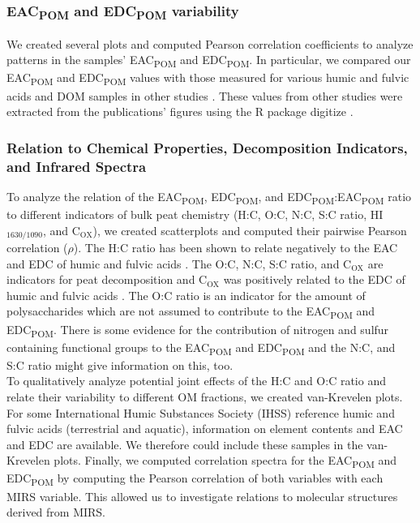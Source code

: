 \documentclass[draft,linenumbers]{agujournal2018}
\begin{document}
\subsubsection{\texorpdfstring{EAC\textsubscript{POM} and
EDC\textsubscript{POM} variability}{EAC and EDC variability}}

We created several plots and computed Pearson correlation coefficients
to analyze patterns in the samples' EAC\textsubscript{POM} and
EDC\textsubscript{POM}. In particular, we compared our
EAC\textsubscript{POM} and EDC\textsubscript{POM} values with those
measured for various humic and fulvic acids and DOM samples in other
studies \citep{Aeschbacher.2012, Tan.2017, Walpen.2018}. These values
from other studies were extracted from the publications' figures using
the R package digitize \citep{Poisot.2011}.

\subsubsection{Relation to Chemical Properties, Decomposition
Indicators, and Infrared Spectra}

To analyze the relation of the EAC\textsubscript{POM},
EDC\textsubscript{POM}, and
EDC\textsubscript{POM}:EAC\textsubscript{POM} ratio to different
indicators of bulk peat chemistry (H:C, O:C, N:C, S:C ratio,
HI\(_\text{1630/1090}\), and C\(_\text{OX}\)), we created scatterplots
and computed their pairwise Pearson correlation (\(\rho\)). The H:C
ratio has been shown to relate negatively to the EAC and EDC of humic
and fulvic acids \citep{Aeschbacher.2010, Tan.2017, Lv.2018}. The O:C,
N:C, S:C ratio, and C\(_\text{OX}\) are indicators for peat
decomposition \citep{Masiello.2008, Biester.2014, Leifeld.2012} and
C\(_\text{OX}\) was positively related to the EDC of humic and fulvic
acids \citep{Lv.2018}. The O:C ratio is an indicator for the amount of
polysaccharides \citep{Kim.2003} which are not assumed to contribute to
the EAC\textsubscript{POM} and EDC\textsubscript{POM}. There is some
evidence for the contribution of nitrogen and sulfur containing
functional groups to the EAC\textsubscript{POM} and
EDC\textsubscript{POM}
\citep{Ratasuk.2007, Fimmen.2007, HernandezMontoya.2012} and the N:C,
and S:C ratio might give information on this, too.\\
To qualitatively analyze potential joint effects of the H:C and O:C
ratio and relate their variability to different OM fractions, we created
van-Krevelen plots. For some International Humic Substances Society
(IHSS) reference humic and fulvic acids (terrestrial and aquatic),
information on element contents \citep{HuffmanLaboratories.NA} and EAC
and EDC \citep{Aeschbacher.2012} are available. We therefore could
include these samples in the van-Krevelen plots. Finally, we computed
correlation spectra for the EAC\textsubscript{POM} and
EDC\textsubscript{POM} by computing the Pearson correlation of both
variables with each MIRS variable. This allowed us to investigate
relations to molecular structures derived from MIRS.
\end{document}
